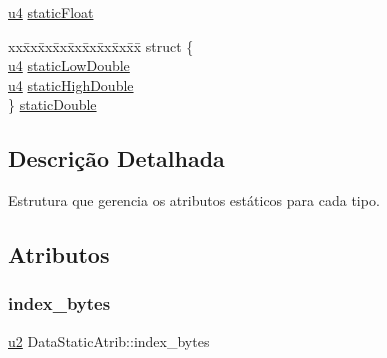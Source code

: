 \begin{DoxyCompactItemize}
\begin{tabbing}
\end{tabbing}\item 
\hyperlink{ClassLoader_8h_aedf6ddc03df8caaaccbb4c60b9a9b850}{u4} \hyperlink{unionDataStaticAtrib_a9ad6975d8a8bbc1b4587aad4077fc6c8}{static\+Float}
\item 
\begin{tabbing}
xx\=xx\=xx\=xx\=xx\=xx\=xx\=xx\=xx\=\kill
struct \{\\
\>\hyperlink{ClassLoader_8h_aedf6ddc03df8caaaccbb4c60b9a9b850}{u4} \hyperlink{unionDataStaticAtrib_a8ee07b1e266aef56917b0d24be2766e4}{staticLowDouble}\\
\>\hyperlink{ClassLoader_8h_aedf6ddc03df8caaaccbb4c60b9a9b850}{u4} \hyperlink{unionDataStaticAtrib_a64fbbc4728f4f98aa2fb483f5ab3110b}{staticHighDouble}\\
\} \hyperlink{unionDataStaticAtrib_ac9efd2fc6cd0db25773e2241bf68e451}{staticDouble}\\

\end{tabbing}\end{DoxyCompactItemize}


\subsection{Descrição Detalhada}
Estrutura que gerencia os atributos estáticos para cada tipo. 

\subsection{Atributos}
\mbox{\label{unionDataStaticAtrib_ada02ebc6846de921edad741e3052b40e}} 
\subsubsection{\texorpdfstring{index\+\_\+bytes}{index\_bytes}}
{\footnotesize\ttfamily \hyperlink{ClassLoader_8h_a5f223212eef04d10a4550ded680cb1cf}{u2} Data\+Static\+Atrib\+::index\+\_\+bytes}

\mbox{\label{unionDataStaticAtrib_a30e703ce693927359d7f287e11b379e8}} 
